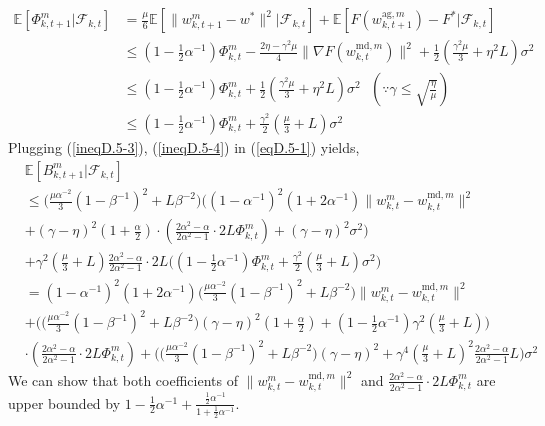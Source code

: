 \begin{align} \label{ineqD.5-4}
    \mathbb{E}[\Phi_{k, t+1}^m|\mathcal{F}_{k, t}] &= \frac{\mu}{6}\mathbb{E}[\|w_{k, t+1}^m-w^*\|^2|\mathcal{F}_{k, t}] + \mathbb{E}[F(w_{k, t+1}^{\textrm{ag}, m}) - F^*|\mathcal{F}_{k, t}] \nonumber\\
    &\leq (1-\frac{1}{2}\alpha^{-1})\Phi_{k, t}^m - \frac{2\eta - \gamma^2\mu}{4}\|\nabla F(w_{k, t}^{\textrm{md}, m})\|^2 + \frac{1}{2}(\frac{\gamma^2\mu}{3}+\eta^2 L)\sigma^2 \nonumber\\
    &\leq (1-\frac{1}{2}\alpha^{-1})\Phi_{k, t}^m  + \frac{1}{2}(\frac{\gamma^2\mu}{3}+\eta^2 L)\sigma^2 \textrm{ }(\because \gamma \leq \sqrt{\frac{\eta}{\mu}}) \nonumber\\
    &\leq (1-\frac{1}{2}\alpha^{-1})\Phi_{k, t}^m  + \frac{\gamma^2}{2}(\frac{\mu}{3}+L)\sigma^2
\end{align}
Plugging (\ref{ineqD.5-3}), (\ref{ineqD.5-4}) in (\ref{eqD.5-1}) yields,
\begin{align} \label{ineqD.5-5}
    &\mathbb{E}[B_{k, t+1}^m|\mathcal{F}_{k, t}] \nonumber\\
    &\leq  \Big(\frac{\mu\alpha^{-2}}{3}(1-\beta^{-1})^2 + L\beta^{-2}\Big)\Big((1-\alpha^{-1})^2(1+2\alpha^{-1}) \|w_{k, t}^m - w_{k, t}^{\textrm{md}, m}\|^2 \nonumber\\
    &+ (\gamma-\eta)^2(1+\frac{\alpha}{2}) \cdot (\frac{2\alpha^2-\alpha}{2\alpha^2-1}\cdot 2L \Phi_{k, t}^m) + (\gamma-\eta)^2 \sigma^2 \Big) \nonumber\\
    &+ \gamma^2(\frac{\mu}{3} + L)\frac{2\alpha^2-\alpha}{2\alpha^2-1}\cdot 2L\Big((1-\frac{1}{2}\alpha^{-1})\Phi_{k, t}^m  + \frac{\gamma^2}{2}(\frac{\mu}{3}+L)\sigma^2\Big) \nonumber\\
    &= (1-\alpha^{-1})^2(1+2\alpha^{-1})\Big(\frac{\mu\alpha^{-2}}{3}(1-\beta^{-1})^2 + L\beta^{-2}\Big) \|w_{k, t}^m - w_{k, t}^{\textrm{md}, m}\|^2 \nonumber\\
    &+ \bigg(\Big(\frac{\mu\alpha^{-2}}{3}(1-\beta^{-1})^2 + L\beta^{-2}\Big)(\gamma-\eta)^2(1+\frac{\alpha}{2}) + (1-\frac{1}{2}\alpha^{-1})\gamma^2(\frac{\mu}{3}+L)\bigg) \nonumber\\
    &\cdot(\frac{2\alpha^2-\alpha}{2\alpha^2-1}\cdot 2L \Phi_{k, t}^m) + \bigg(\Big(\frac{\mu\alpha^{-2}}{3}(1-\beta^{-1})^2 + L\beta^{-2}\Big)(\gamma-\eta)^2+\gamma^4(\frac{\mu}{3}+L)^2\frac{2\alpha^2-\alpha}{2\alpha^2-1}L\bigg)\sigma^2
\end{align}
We can show that both coefficients of $\|w_{k, t}^m - w_{k, t}^{\textrm{md}, m}\|^2$ and $\frac{2\alpha^2-\alpha}{2\alpha^2-1}\cdot 2L \Phi_{k, t}^m$ are upper bounded by $1-\frac{1}{2}\alpha^{-1}+\frac{\frac{1}{2}\alpha^{-1}}{1+\frac{1}{2}\alpha^{-1}}$.
